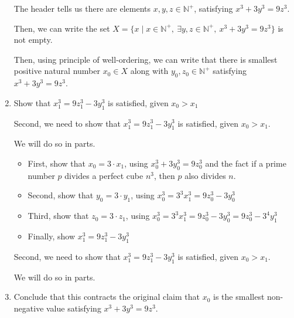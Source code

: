 \documentclass[12pt]{article}
\begin{document}
\begin{mdframed}
\begin{enumerate}[1.]
\begin{mdframed}
        \bigskip

        The header tells us there are elements $x,y,z \in \mathbb{N}^+$, satisfying
        $x^3 + 3y^3 = 9z^3$.

        \bigskip

        Then, we can write the set $X = \{x \mid x \in \mathbb{N}^+,\:\exists y,z \in
        \mathbb{N}^+,\:x^3 + 3y^3 = 9z^3\}$ is not empty.

        \bigskip

        Then, using principle of well-ordering, we can write that there is smallest
        positive natural number $x_0 \in X$ along with $y_0,z_0 \in \mathbb{N}^+$ satisfying
        $x^3 + 3y^3 = 9z^3$.
        \end{mdframed}

        \item Show that $x_1^3 = 9z_1^3 - 3y_1^3$ is satisfied, given $x_0 > x_1$

        \bigskip

        Second, we need to show that $x_1^3 = 9z_1^3 - 3y_1^3$ is satisfied, given
        $x_0 > x_1$.

        \bigskip

        We will do so in parts.

        \bigskip

        \begin{itemize}
            \item First, show that $x_0 = 3 \cdot x_1$, using $x_0^3 + 3y_0^3 = 9z_0^3$ and the
            fact if a prime number $p$ divides a perfect cube $n^3$, then $p$ also divides $n$.
            \item Second, show that $y_0 = 3 \cdot y_1$, using $x_0^3 = 3^3 x_1^3 = 9z_0^3 - 3y_0^3$
            \item Third, show that $z_0 = 3 \cdot z_1$, using $x_0^3 = 3^3 x_1^3 = 9z_0^3 - 3y_0^3 =  9z_0^3 - 3^4y_1^3$
            \item Finally, show $x_1^3 = 9z_1^3 - 3y_1^3$
        \end{itemize}

        \bigskip

        \begin{mdframed}
        Second, we need to show that $x_1^3 = 9z_1^3 - 3y_1^3$ is satisfied, given
        $x_0 > x_1$.

        \bigskip

        We will do so in parts.
        \end{mdframed}

        \item Conclude that this contracts the original claim that $x_0$ is the smallest
        non-negative value satisfying $x^3 + 3y^3 = 9z^3$.

        \begin{mdframed}

        \end{mdframed}
    \end{enumerate}

\end{mdframed}
\end{document}
